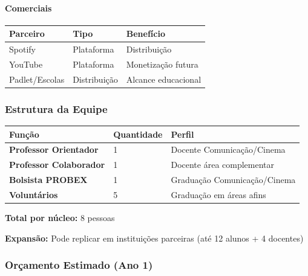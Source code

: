 \bigskip

\paragraph{Comerciais}

\bigskip\noindent
\begin{tabular}{p{}p{}p{}}
\toprule
Parceiro & Tipo & Benefício \\
\hline
Spotify & Plataforma & Distribuição \\
YouTube & Plataforma & Monetização futura \\
Padlet/Escolas & Distribuição & Alcance educacional \\
\bottomrule
\end{tabular}

\bigskip

\subsubsection{Estrutura da Equipe}

\bigskip\noindent
\begin{tabular}{p{}p{}p{}}
\toprule
Função & Quantidade & Perfil \\
\hline
\textbf{Professor Orientador} & 1 & Docente Comunicação/Cinema \\
\textbf{Professor Colaborador} & 1 & Docente área complementar \\
\textbf{Bolsista PROBEX} & 1 & Graduação Comunicação/Cinema \\
\textbf{Voluntários} & 5 & Graduação em áreas afins \\
\bottomrule
\end{tabular}

\bigskip

\textbf{Total por núcleo:} 8 pessoas

\textbf{Expansão:} Pode replicar em instituições parceiras (até 12 alunos + 4 docentes)

\subsubsection{Orçamento Estimado (Ano 1)}

